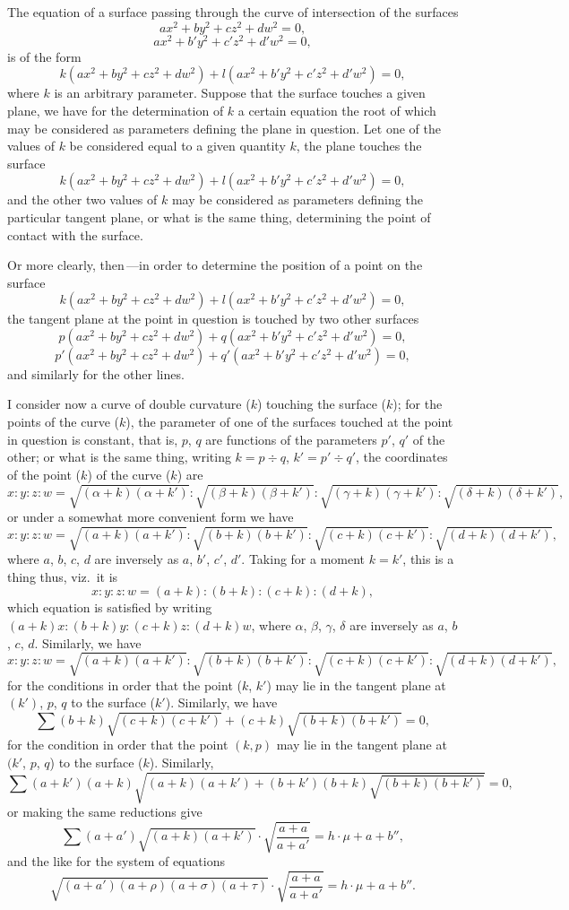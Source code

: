\documentclass[11pt,a4paper]{book}
\begin{document}
\medskip

The equation of a surface passing through the curve of intersection of the surfaces
\[
a x^2 + b y^2 + c z^2 + d w^2 = 0,
\]
\[
a x^2 + b' y^2 + c' z^2 + d' w^2 = 0,
\]
is of the form
\[
k(a x^2 + b y^2 + c z^2 + d w^2) + l(a x^2 + b' y^2 + c' z^2 + d' w^2) = 0,
\]
where $k$ is an arbitrary parameter. Suppose that the surface touches a given plane,
we have for the determination of $k$ a certain equation the root of which may be
considered as parameters defining the plane in question. Let one of the values of $k$
be considered equal to a given quantity $k$, the plane touches the surface
\[
k(a x^2 + b y^2 + c z^2 + d w^2) + l(a x^2 + b' y^2 + c' z^2 + d' w^2) = 0,
\]
and the other two values of $k$ may be considered as parameters defining the particular
tangent plane, or what is the same thing, determining the point of contact with the
surface.

\medskip

Or more clearly, then\,---in order to determine the position of a point on the
surface
\[
k(a x^2 + b y^2 + c z^2 + d w^2) + l(a x^2 + b' y^2 + c' z^2 + d' w^2) = 0,
\]
the tangent plane at the point in question is touched by two other surfaces
\[
p(a x^2 + b y^2 + c z^2 + d w^2) + q(a x^2 + b' y^2 + c' z^2 + d' w^2) = 0,
\]
\[
p'(a x^2 + b y^2 + c z^2 + d w^2) + q'(a x^2 + b' y^2 + c' z^2 + d' w^2) = 0,
\]
and similarly for the other lines.

\medskip

I consider now a curve of double curvature ($k$) touching the surface ($k$); for the
points of the curve ($k$), the parameter of one of the surfaces touched at the point in
question is constant, that is, $p$, $q$ are functions of the parameters $p'$, $q'$ of the
other; or what is the same thing, writing $k=p\div q$, $k'=p'\div q'$, the coordinates of the point ($k$) of the curve ($k$) are
\[
x:y:z:w = \sqrt{(\alpha+k)(\alpha+k')}:\sqrt{(\beta+k)(\beta+k')}:\sqrt{(\gamma+k)(\gamma+k')}:\sqrt{(\delta+k)(\delta+k')},
\]
or under a somewhat more convenient form we have
\[
x:y:z:w = \sqrt{(a+k)(a+k')}:\sqrt{(b+k)(b+k')}:\sqrt{(c+k)(c+k')}:\sqrt{(d+k)(d+k')},
\]
where $a$, $b$, $c$, $d$ are inversely as $a$, $b'$, $c'$, $d'$. Taking for a moment $k=k'$, this is a thing thus, viz.\ it is
\[
x:y:z:w = (a+k):(b+k):(c+k):(d+k),
\]
which equation is satisfied by writing $(a+k)x : (b+k)y : (c+k)z : (d+k)w$, where $\alpha$, $\beta$, $\gamma$, $\delta$ are inversely as $a$, $b$, $c$, $d$. Similarly, we have
\[
x:y:z:w = \sqrt{(a+k)(a+k')}:\sqrt{(b+k)(b+k')}:\sqrt{(c+k)(c+k')}:\sqrt{(d+k)(d+k')},
\]
for the conditions in order that the point ($k$, $k'$) may lie in the tangent plane at
$(k')$, $p$, $q$ to the surface ($k'$). Similarly, we have
\[
\sum (b+k)\sqrt{(c+k)(c+k')}+(c+k)\sqrt{(b+k)(b+k')} = 0,
\]
for the condition in order that the point $(k, p)$ may lie in the tangent plane at
$(k'$, $p$, $q$) to the surface ($k$). Similarly,
\[
\sum (a+k')(a+k)\sqrt{(a+k)(a+k')+(b+k')(b+k)\sqrt{(b+k)(b+k')}} = 0,
\]
or making the same reductions give
\[
\sum (a+a')\sqrt{(a+k)(a+k')}\cdot\sqrt{\frac{a+a}{a+a'}} = h \cdot \mu + a + b'',
\]
and the like for the system of equations
\[
\sqrt{(a+a')(a+\rho)(a+\sigma)(a+\tau)} \cdot \sqrt{\frac{a+a}{a+a'}} = h \cdot \mu + a + b''.
\]
\end{document}
